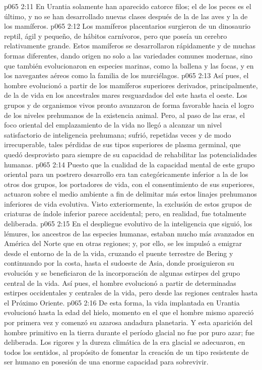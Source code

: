 \vs p065 2:11 \pc En Urantia solamente han aparecido catorce filos; el de los peces es el último, y no se han desarrollado nuevas clases después de la de las aves y la de los mamíferos.
\vs p065 2:12 \pc Los mamíferos placentarios surgieron  de un dinosaurio reptil, ágil y pequeño, de hábitos carnívoros, pero que poseía un cerebro relativamente grande. Estos mamíferos se desarrollaron rápidamente y de muchas formas diferentes, dando origen no solo a las variedades comunes modernas, sino que también evolucionaron en especies marinas, como la ballena y las focas, y en los navegantes aéreos como la familia de los murciélagos.
\vs p065 2:13 Así pues, el hombre evolucionó a partir de los mamíferos superiores derivados, principalmente, de la  de vida en los ancestrales mares resguardados del este hasta el oeste. Los grupos  y  de organismos vivos pronto avanzaron de forma favorable hacia el logro de los niveles prehumanos de la existencia animal. Pero, al paso de las eras, el foco oriental del emplazamiento de la vida no llegó a alcanzar un nivel satisfactorio de inteligencia prehumana; sufrió, repetidas veces y de modo irrecuperable, tales pérdidas de sus tipos superiores de plasma germinal, que quedó desprovisto para siempre de su capacidad de rehabilitar las potencialidades humanas.
\vs p065 2:14 Puesto que la cualidad de la capacidad mental de este grupo oriental para un postrero desarrollo era tan categóricamente inferior a la de los otros dos grupos, los portadores de vida, con el consentimiento de sus superiores, actuaron sobre el medio ambiente a fin de delimitar más estos linajes prehumanos inferiores de vida evolutiva. Visto exteriormente, la exclusión de estos grupos de criaturas de índole inferior parece accidental; pero, en realidad, fue totalmente deliberada.
\vs p065 2:15 En el despliegue evolutivo de la inteligencia que siguió, los lémures, los ancestros de las especies humanas, estaban mucho más avanzados en América del Norte que en otras regiones; y, por ello, se les impulsó a emigrar desde el entorno de la  de la vida, cruzando el puente terrestre de Bering y continuando por la costa, hasta el sudoeste de Asia, donde prosiguieron su evolución y se beneficiaron de la incorporación de algunas estirpes del grupo central de la vida. Así pues, el hombre evolucionó a partir de determinadas estirpes occidentales y centrales de la vida, pero desde las regiones centrales hasta el Próximo Oriente.
\vs p065 2:16 De esta forma, la vida implantada en Urantia evolucionó hasta la edad del hielo, momento en el que el hombre mismo apareció por primera vez y comenzó su azarosa andadura planetaria. Y esta aparición del hombre primitivo en la tierra durante el período glacial no fue por puro azar; fue deliberada. Los rigores y la dureza climática de la era glacial se adecuaron, en todos los sentidos, al propósito de fomentar la creación de un tipo resistente de ser humano en posesión de una enorme capacidad para sobrevivir.
